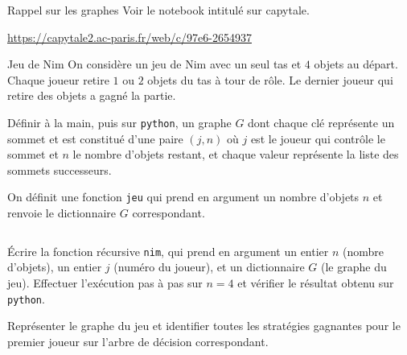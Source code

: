 \begin{exo}[PC][1][python]{Rappel sur les graphes}
Voir le notebook intitulé  sur capytale.
\begin{center}
  \href{https://capytale2.ac-paris.fr/web/c/97e6-2654937}{https://capytale2.ac-paris.fr/web/c/97e6-2654937}
\end{center}
\end{exo}


\begin{exo}[PC][1][colle]{Jeu de Nim}
On considère un jeu de Nim avec un seul tas et $4$ objets au départ. Chaque joueur retire $1$ ou $2$ objets du tas à tour de rôle. Le dernier joueur qui retire des objets a gagné la partie.
\begin{quest}
\item Définir à la main, puis sur \texttt{python}, un graphe $G$ dont chaque clé représente un sommet et est constitué d'une paire $(j,n)$ où $j$ est le joueur qui contrôle le sommet et $n$ le nombre d'objets restant, et chaque valeur représente la liste des sommets successeurs.
\item On définit une fonction \texttt{jeu} qui prend en argument un nombre d'objets $n$ et renvoie le dictionnaire $G$ correspondant.
\inputminted[linenos=true]{python}{\pathtoexos/Info/Scripts/nim.py}
Écrire la fonction récursive \texttt{nim}, qui prend en argument un entier $n$ (nombre d'objets), un entier $j$ (numéro du joueur), et un dictionnaire $G$ (le graphe du jeu). Effectuer l'exécution pas à pas sur $n=4$ et  vérifier le résultat obtenu sur \texttt{python}.
\item Représenter le graphe du jeu et identifier toutes les stratégies gagnantes pour le premier joueur sur l'arbre de décision correspondant.
\end{quest}
\end{exo}


